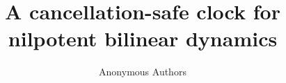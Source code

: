 \documentclass[11pt]{article}
\title{A cancellation-safe clock for nilpotent bilinear dynamics}
\author{Anonymous Authors}
\date{}
\begin{document}
\maketitle
\begin{abstract}

\end{abstract}







\end{document}
